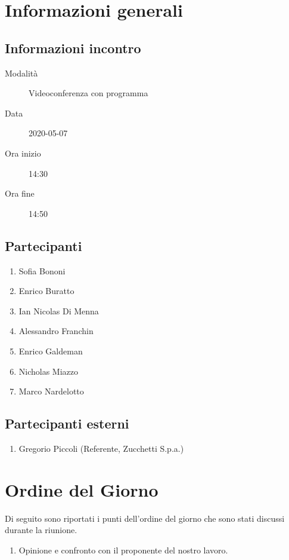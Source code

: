 \documentclass{article}
\begin{document}


\section{Informazioni generali}%
\label{sec:informazioni_generali}

\subsection{Informazioni incontro}%
\label{sub:informazioni_incontro}

\begin{description}
  \item[Modalità] Videoconferenza con programma 
  \item[Data] 2020-05-07
  \item[Ora inizio] 14:30
  \item[Ora fine] 14:50
\end{description}

\subsection{Partecipanti}%
\label{sub:partecipanti}

\begin{enumerate}
  \item Sofia Bononi
  \item Enrico Buratto
  \item Ian Nicolas Di Menna
  \item Alessandro Franchin
  \item Enrico Galdeman
  \item Nicholas Miazzo
  \item Marco Nardelotto
\end{enumerate}

\subsection{Partecipanti esterni}%
\label{sub:partecipanti esterni}

\begin{enumerate}
    \item Gregorio Piccoli (Referente, Zucchetti S.p.a.)
\end{enumerate}


\section{Ordine del Giorno}%
\label{ordine_del_giorno}
Di seguito sono riportati i punti dell'ordine del giorno che sono stati discussi durante la riunione.
\begin{enumerate}
  \item Opinione e confronto con il proponente del nostro lavoro.
\end{enumerate}
\end{document}
